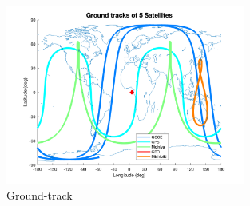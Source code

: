 \documentclass[12pt
,headinclude
,headsepline
,bibtotocnumbered
]{scrartcl}
\begin{document}
\begin{figure}[H]
    \centering
    \includegraphics[width=0.7\textwidth]{plots/groundtrack.png}
    \caption{Ground-track}
    \label{fig:ground_track}
\end{figure}
\end{document}
